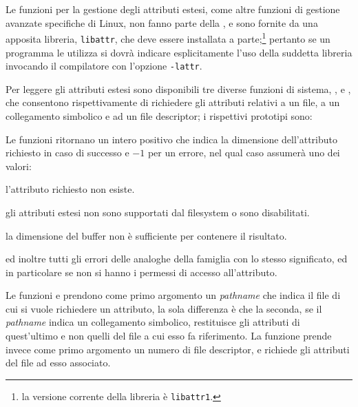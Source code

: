 Le funzioni per la gestione degli attributi estesi, come altre funzioni di
gestione avanzate specifiche di Linux, non fanno parte della , e
sono fornite da una apposita libreria, \texttt{libattr}, che deve essere
installata a parte;\footnote{la versione corrente della libreria è
  \texttt{libattr1}.}  pertanto se un programma le utilizza si dovrà indicare
esplicitamente l'uso della suddetta libreria invocando il compilatore con
l'opzione \texttt{-lattr}.  

Per leggere gli attributi estesi sono disponibili tre diverse funzioni di
sistema, ,  e , che
consentono rispettivamente di richiedere gli attributi relativi a un file, a
un collegamento simbolico e ad un file descriptor; i rispettivi prototipi
sono:

\begin{funcproto}{
}

{Le funzioni ritornano un intero positivo che indica la dimensione
  dell'attributo richiesto in caso di successo e $-1$ per un errore, nel qual
  caso  assumerà uno dei valori:
  \begin{errlist}
  \item[\errcode{ENOATTR}] l'attributo richiesto non esiste.
  \item[\errcode{ENOTSUP}] gli attributi estesi non sono supportati dal
    filesystem o sono disabilitati.
  \item[\errcode{ERANGE}] la dimensione  del buffer 
    non è sufficiente per contenere il risultato.
  \end{errlist}
  ed inoltre tutti gli errori delle analoghe della famiglia  con lo
  stesso significato, ed in particolare  se non si hanno i
  permessi di accesso all'attributo.}
\end{funcproto}

Le funzioni  e  prendono come primo argomento
un \textit{pathname} che indica il file di cui si vuole richiedere un
attributo, la sola differenza è che la seconda, se il \textit{pathname} indica
un collegamento simbolico, restituisce gli attributi di quest'ultimo e non
quelli del file a cui esso fa riferimento. La funzione  prende
invece come primo argomento un numero di file descriptor, e richiede gli
attributi del file ad esso associato.

